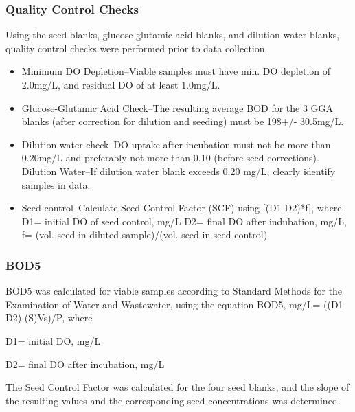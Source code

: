 \documentclass{article}
\begin{document}
\subsubsection*{Quality Control Checks}
Using the seed blanks, glucose-glutamic acid blanks, and dilution water blanks, quality control checks were performed prior to data collection. 
\begin{itemize}
  \item Minimum DO Depletion--Viable samples must have min. DO depletion of 2.0mg/L, and residual DO of at least 1.0mg/L.
  \item Glucose-Glutamic Acid Check--The resulting average BOD for the 3 GGA blanks (after correction for dilution and seeding) must be 198+/- 30.5mg/L.
  \item Dilution water check--DO uptake after incubation must not be more than 0.20mg/L and preferably not more than 0.10 (before seed corrections). 
  \subitem Dilution Water--If dilution water blank exceeds 0.20 mg/L, clearly identify samples in data.
  \item Seed control--Calculate Seed Control Factor (SCF) using [(D1-D2)*f], where
  \subitem D1= initial DO of seed control, mg/L
  \subitem D2= final DO after indubation, mg/L,
  \subitem f= (vol. seed in diluted sample)/(vol. seed in seed control)
\end{itemize}

\subsubsection*{BOD5}
BOD5 was calculated for viable samples according to Standard Methods for the Examination of Water and Wastewater, using the equation 
BOD5, mg/L= ((D1-D2)-(S)Vs)/P, where 


D1= initial DO, mg/L

D2= final DO after incubation, mg/L

The Seed Control Factor was calculated for the four seed blanks, and the slope of the resulting values and the corresponding seed concentrations was determined. 
\end{document}
